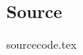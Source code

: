 \documentclass[final]{scrreprt} %
\begin{document}
\begin{appendices}
\chapter{Source}
\label{app:source}
{sourcecode.tex}

\end{appendices}
\end{document}
